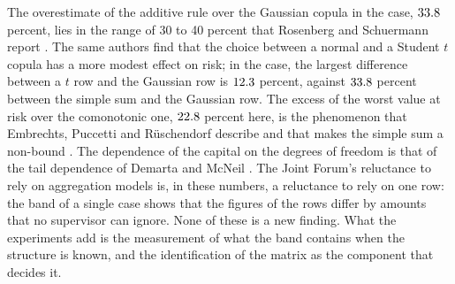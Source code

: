 The overestimate of the additive rule over the Gaussian copula in the case, $33.8$ percent, lies in the range of 30 to 40
percent that Rosenberg and Schuermann report \citep{rosenberg2006}. The same authors find that the choice between a normal and a Student $t$ copula has a more modest effect
on risk; in the case, the largest difference between a $t$ row and the Gaussian row is $12.3$ percent, against
$33.8$ percent between the simple sum and the Gaussian row. The excess of the worst value at risk over the comonotonic one,
$22.8$ percent here, is the phenomenon that Embrechts, Puccetti and R\"uschendorf describe and that makes the simple
sum a non-bound \citep{epr2013}. The dependence of the capital on the degrees of freedom is that of the tail dependence of
Demarta and McNeil \citep{demarta2005}. The Joint Forum's reluctance to rely on aggregation models \citep{jointforum2010} is, in
these numbers, a reluctance to rely on one row: the band of a single case shows that the figures of the rows differ by amounts
that no supervisor can ignore. None of these is a new finding. What the experiments add is the measurement of what the band contains
when the structure is known, and the identification of the matrix as the component that decides it.
